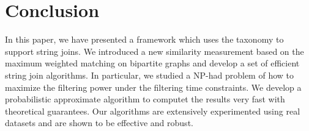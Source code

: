\section{Conclusion}

In this paper, we have presented a framework which uses the taxonomy to support string joins. We introduced a new similarity measurement based on the maximum weighted matching on bipartite graphs and develop a set of efficient string join algorithms. In particular, we  
 studied a NP-had problem of how to maximize the filtering power under the filtering time constraints. We develop a probabilistic approximate algorithm to computet the results very fast with theoretical guarantees. Our algorithms are extensively experimented using real datasets and are shown to be effective and robust.
